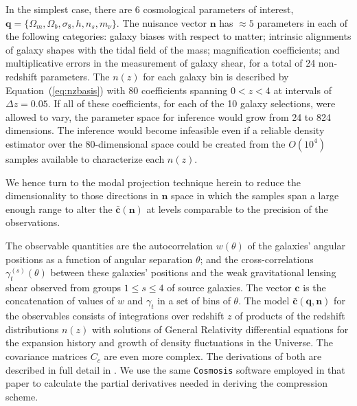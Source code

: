 \documentclass[onecolumn,resetfootnote]{aastex7}
\newcommand{\eqq}[1]{Equation~(\ref{#1})}
\newcommand{\vecc}{\ensuremath{\mathbf{c}}}
\newcommand{\vecq}{\ensuremath{\mathbf{q}}}
\newcommand{\vecn}{\ensuremath{\mathbf{n}}}
\newcommand{\hatc}{\ensuremath{\bar{\mathbf{c}}}}
\newcommand{\covm}{C}
\begin{document}
In the simplest case,
there are 6 cosmological parameters of interest, $\vecq = \{\Omega_m,
\Omega_b, \sigma_8, h, n_s, m_\nu\}.$   The nuisance vector $\vecn$
has $\approx 5$  parameters in each of the following categories: galaxy
biases with respect to matter; intrinsic alignments of galaxy shapes
with the tidal field of the mass; magnification coefficients; and multiplicative errors in the
measurement of galaxy shear, for a total of 24 non-redshift parameters.  The $n(z)$ for each galaxy bin
is
described by \eqq{eq:nzbasis} with 80 coefficients spanning $0<z<4$ at
intervals of $\Delta z=0.05.$ If all of these coefficients, for each
of the 10 galaxy selections, were allowed to vary, the parameter space for inference would grow from 24 to 824 dimensions.
The inference would become infeasible even if a
reliable density estimator over the 80-dimensional space could be
created from the $O(10^4)$ samples available to characterize each
$n(z).$ 

We hence turn to the modal projection technique herein to reduce the
dimensionality to those directions in $\vecn$ space in which the samples span a large
enough range to alter the $\hatc(\vecn)$ at levels comparable to the
  precision of the observations.

The observable quantities are the autocorrelation $w(\theta)$ of the 
galaxies' angular positions as a function of angular separation $\theta$;
  and the cross-correlations $\gamma_t^{(s)}(\theta)$ between 
these galaxies' positions and the weak gravitational lensing shear
observed from groups $1\le s \le 4$ of source galaxies.  The vector $\vecc$ is
the concatenation of values of $w$ and $\gamma_t$ in a set of bins of $\theta.$
The model $\hatc(\vecq,\vecn)$ for the observables consists of integrations
  over redshift $z$ of products of the redshift distributions $n(z)$ with
  solutions of General Relativity differential equations for the expansion
  history and growth of density fluctuations in the Universe.  The covariance
  matrices $\covm_c$ are even more complex.  The derivations of both are
  described in full detail in 
 \citet{y6model}. We use the same \texttt{Cosmosis} software \citep{cosmosis}
 employed in that paper to
calculate the partial derivatives needed in deriving the compression scheme.
\end{document}
